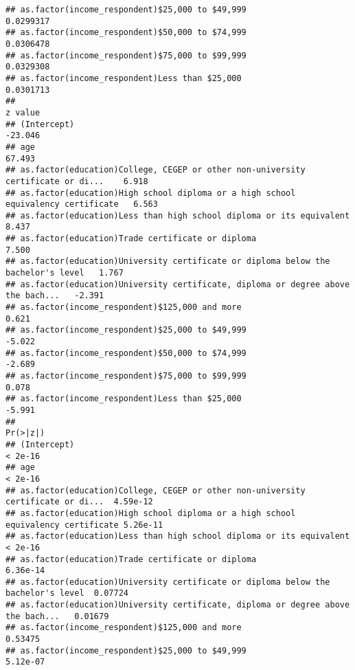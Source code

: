 \documentclass[
]{article}
\begin{document}
\begin{verbatim}
## as.factor(income_respondent)$25,000 to $49,999                                    0.0299317
## as.factor(income_respondent)$50,000 to $74,999                                    0.0306478
## as.factor(income_respondent)$75,000 to $99,999                                    0.0329308
## as.factor(income_respondent)Less than $25,000                                     0.0301713
##                                                                                  z value
## (Intercept)                                                                      -23.046
## age                                                                               67.493
## as.factor(education)College, CEGEP or other non-university certificate or di...    6.918
## as.factor(education)High school diploma or a high school equivalency certificate   6.563
## as.factor(education)Less than high school diploma or its equivalent                8.437
## as.factor(education)Trade certificate or diploma                                   7.500
## as.factor(education)University certificate or diploma below the bachelor's level   1.767
## as.factor(education)University certificate, diploma or degree above the bach...   -2.391
## as.factor(income_respondent)$125,000 and more                                      0.621
## as.factor(income_respondent)$25,000 to $49,999                                    -5.022
## as.factor(income_respondent)$50,000 to $74,999                                    -2.689
## as.factor(income_respondent)$75,000 to $99,999                                     0.078
## as.factor(income_respondent)Less than $25,000                                     -5.991
##                                                                                  Pr(>|z|)
## (Intercept)                                                                       < 2e-16
## age                                                                               < 2e-16
## as.factor(education)College, CEGEP or other non-university certificate or di...  4.59e-12
## as.factor(education)High school diploma or a high school equivalency certificate 5.26e-11
## as.factor(education)Less than high school diploma or its equivalent               < 2e-16
## as.factor(education)Trade certificate or diploma                                 6.36e-14
## as.factor(education)University certificate or diploma below the bachelor's level  0.07724
## as.factor(education)University certificate, diploma or degree above the bach...   0.01679
## as.factor(income_respondent)$125,000 and more                                     0.53475
## as.factor(income_respondent)$25,000 to $49,999                                   5.12e-07

\end{verbatim}
\end{document}
